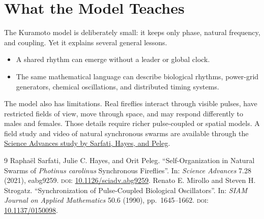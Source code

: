 \documentclass[11pt]{article}
\begin{document}
\section{What the Model Teaches}
The Kuramoto model is deliberately small: it keeps only phase, natural frequency,
and coupling. Yet it explains several general lessons.
\begin{itemize}[label=$\diamond$]
    \item A shared rhythm can emerge without a leader or global clock.
    \item The same mathematical language can describe biological rhythms,
          power-grid generators, chemical oscillations, and distributed timing
          systems.
\end{itemize}
The model also has limitations. Real fireflies interact through visible pulses,
have restricted fields of view, move through space, and may respond differently to
males and females. Those details require richer pulse-coupled or spatial models. A
field study and video of natural synchronous swarms are available through the
\href{https://doi.org/10.1126/sciadv.abg9259}{Science Advances study by Sarfati,
Hayes, and Peleg}.

\begin{thebibliography}{9}
    Rapha\"el Sarfati, Julie C. Hayes, and Orit Peleg. ``Self-Organization in
    Natural Swarms of \emph{Photinus carolinus} Synchronous Fireflies''. In:
    \emph{Science Advances} 7.28 (2021), eabg9259.
    \textsc{doi}: \href{https://doi.org/10.1126/sciadv.abg9259}{10.1126/sciadv.abg9259}.
    Renato E. Mirollo and Steven H. Strogatz. ``Synchronization of Pulse-Coupled
    Biological Oscillators''. In: \emph{SIAM Journal on Applied Mathematics} 50.6
    (1990), pp.~1645--1662.
    \textsc{doi}: \href{https://doi.org/10.1137/0150098}{10.1137/0150098}.
\end{thebibliography}
\end{document}
